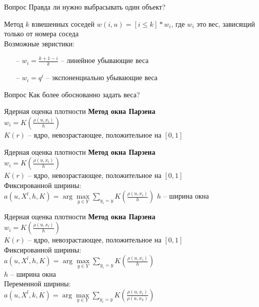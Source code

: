 \documentclass[10pt]{beamer}
\begin{document}
\begin{frame}{Вопрос}
	Правда ли нужно выбрасывать один объект?
\end{frame}

\begin{frame}{Метод $k$ взвешенных соседей}
	${w(i,u) = [i \leq k] * w_i}$, где $w_i$ это вес, зависящий только от номера соседа\\
	\bigbreak
	Возможные эвристики:\\
	\begin{itemize} [<+- | alert@+>]
	\item[--] ${w_i = \frac{k+1-i}{k}}$ -- линейное убывающие веса\\ %
	\item[--] ${w_i = q^i}$ -- экспоненциально убывающие веса\\
	\end{itemize}
\end{frame}

\begin{frame}{Вопрос}
	\centering
	Как более обоснованно задать веса?\\
\end{frame}

\begin{frame}{Ядерная оценка плотности}
	\textbf{Метод окна Парзена}\\
	\bigbreak
	${w_i = K(\frac{\rho(u, x_i)}{h})}$\\
	$K(r)$ -- ядро, невозрастающее, положительное на ${[0, 1]}$\\
\end{frame}

\begin{frame}{Ядерная оценка плотности}
	\textbf{Метод окна Парзена}\\
	${w_i = K(\frac{\rho(u, x_i)}{h})}$\\
	$K(r)$ -- ядро, невозрастающее, положительное на ${[0, 1]}$\\
	\bigbreak
	Фиксированной ширины:\\
	${a(u, X^l, h, K) = \arg\max\limits_{y \in Y} \sum\limits_{y_i = y} K(\frac{\rho(u, x_i)}{h})}$ \hspace{5mm} $h$ -- ширина окна\\
\end{frame}

\begin{frame}{Ядерная оценка плотности}
	\textbf{Метод окна Парзена}\\
	${w_i = K(\frac{\rho(u, x_i)}{h})}$\\
	$K(r)$ -- ядро, невозрастающее, положительное на ${[0, 1]}$\\
  \bigbreak
	Фиксированной ширины:\\
	${a(u, X^l, h, K) = \arg\max\limits_{y \in Y} \sum\limits_{y_i = y} K(\frac{\rho(u, x_i)}{h})}$\\
	$h$ -- ширина окна\\
  \bigbreak
	Переменной ширины:\\
	${a(u, X^l, k, K) = \arg\max\limits_{y \in Y} \sum\limits_{y_i = y}  K(\frac{\rho(u, x_i)}{\rho(u, x_{k})})}$
\end{frame}
\end{document}
